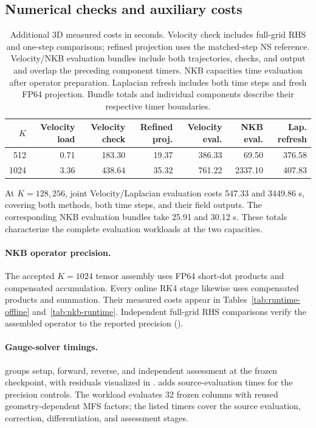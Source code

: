 \subsection{Numerical checks and auxiliary costs}
\begin{table}[!htb]\centering\footnotesize\setlength{\tabcolsep}{4pt}
\caption{Additional 3D measured costs in seconds. Velocity check includes full-grid RHS and one-step comparisons; refined projection uses the matched-step NS reference. Velocity/NKB evaluation bundles include both trajectories, checks, and output and overlap the preceding component timers. NKB capacities time evaluation after operator preparation. Laplacian refresh includes both time steps and fresh FP64 projection. Bundle totals and individual components describe their respective timer boundaries.}
\label{tab:runtime-3d-checks}

\begin{tabular}{rrrrrrr}\toprule
$K$&Velocity load&Velocity check&Refined proj.&Velocity eval.&NKB eval.&Lap. refresh\\\midrule
512 & 0.71 & 183.30 & 19.37 & 386.33 & 69.50 & 376.58\\
1024 & 3.36 & 438.64 & 35.32 & 761.22 & 2337.10 & 407.83\\
\bottomrule\end{tabular}\end{table}
At $K=128,256$, joint Velocity/Laplacian evaluation costs 547.33 and 3449.86 s, covering both methods, both time steps, and their field outputs. The corresponding NKB evaluation bundles take 25.91 and 30.12 s. These totals characterize the complete evaluation workloads at the two capacities.

\paragraph{NKB operator precision.}
The accepted $K=1024$ tensor assembly uses FP64 short-dot products and compensated accumulation. Every online RK4 stage likewise uses compensated products and summation. Their measured costs appear in Tables~\ref{tab:runtime-offline} and~\ref{tab:nkb-runtime}. Independent full-grid RHS comparisons verify the assembled operator to the reported precision ().

\paragraph{Gauge-solver timings.}
 groups setup, forward, reverse, and independent
assessment at the frozen checkpoint, with residuals visualized in .
 adds source-evaluation times for the precision controls.
The workload evaluates 32 frozen columns with reused geometry-dependent MFS factors;
the listed timers cover the source evaluation, correction, differentiation, and assessment stages.




